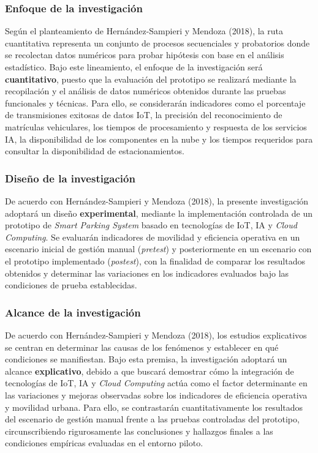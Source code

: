 \documentclass[12pt,a4paper]{article}
\begin{document}
\subsubsection{Enfoque de la investigación}
Según el planteamiento de Hernández-Sampieri y Mendoza (2018), la ruta cuantitativa representa un conjunto de procesos secuenciales y probatorios donde se recolectan datos numéricos para probar hipótesis con base en el análisis estadístico. Bajo este lineamiento, el enfoque de la investigación será \textbf{cuantitativo}, puesto que la evaluación del prototipo se realizará mediante la recopilación y el análisis de datos numéricos obtenidos durante las pruebas funcionales y técnicas. Para ello, se considerarán indicadores como el porcentaje de transmisiones exitosas de datos IoT, la precisión del reconocimiento de matrículas vehiculares, los tiempos de procesamiento y respuesta de los servicios IA, la disponibilidad de los componentes en la nube y los tiempos requeridos para consultar la disponibilidad de estacionamientos.

\subsubsection{Diseño de la investigación}
De acuerdo con Hernández-Sampieri y Mendoza (2018), la presente investigación adoptará un diseño \textbf{experimental}, mediante la implementación controlada de un prototipo de \textit{Smart Parking System} basado en tecnologías de IoT, IA y \textit{Cloud Computing}. Se evaluarán indicadores de movilidad y eficiencia operativa en un escenario inicial de gestión manual (\textit{pretest}) y posteriormente en un escenario con el prototipo implementado (\textit{postest}), con la finalidad de comparar los resultados obtenidos y determinar las variaciones en los indicadores evaluados bajo las condiciones de prueba establecidas.


\subsubsection{Alcance de la investigación}

De acuerdo con Hernández-Sampieri y Mendoza (2018), los estudios explicativos se centran en determinar las causas de los fenómenos y establecer en qué condiciones se manifiestan. Bajo esta premisa, la investigación adoptará un alcance \textbf{explicativo}, debido a que buscará demostrar cómo la integración de tecnologías de IoT, IA y \textit{Cloud Computing} actúa como el factor determinante en las variaciones y mejoras observadas sobre los indicadores de eficiencia operativa y movilidad urbana. Para ello, se contrastarán cuantitativamente los resultados del escenario de gestión manual frente a las pruebas controladas del prototipo, circunscribiendo rigurosamente las conclusiones y hallazgos finales a las condiciones empíricas evaluadas en el entorno piloto.
\end{document}
